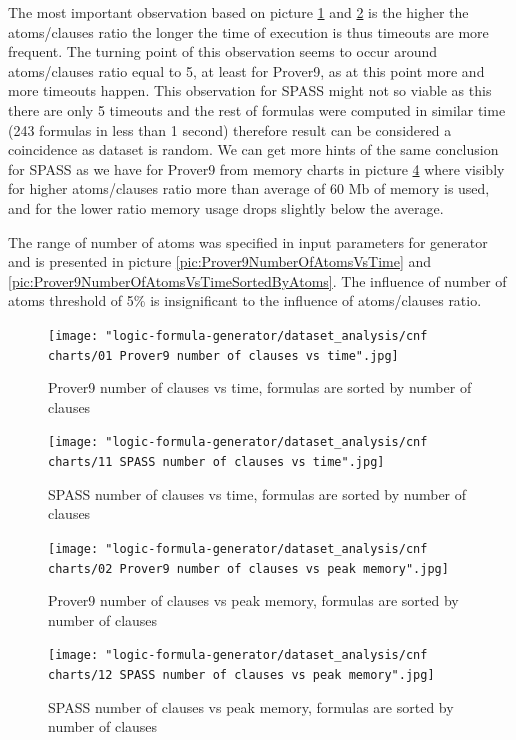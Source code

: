 The most important observation based on picture \ref{pic:Prover9NumberOfClausesVsTime} and \ref{pic:SPASSNumberOfClausesVsTime} is the higher the atoms/clauses ratio the longer the time of execution is thus timeouts are more frequent. The turning point of this observation seems to occur around atoms/clauses ratio equal to 5, at least for Prover9, as at this point more and more timeouts happen. This observation for SPASS might not so viable as this there are only 5 timeouts and the rest of formulas were computed in similar time (243 formulas in less than 1 second) therefore result can be considered a coincidence as dataset is random. We can get more hints of the same conclusion for SPASS as we have for Prover9 from memory charts in picture \ref{pic:SPASSNumberOfClausesVsMemory} where visibly for higher atoms/clauses ratio more than average of 60 Mb of memory is used, and for the lower ratio memory usage drops slightly below the average.

The range of number of atoms was specified in input parameters for generator and is presented in picture \ref{pic:Prover9NumberOfAtomsVsTime} and \ref{pic:Prover9NumberOfAtomsVsTimeSortedByAtoms}. The influence of number of atoms threshold of 5\% is insignificant to the influence of atoms/clauses ratio.

\begin{figure}[h]
  \centering
  \texttt{[image: "logic-formula-generator/dataset\_analysis/cnf charts/01 Prover9 number of clauses vs time".jpg]}
  \caption{Prover9 number of clauses vs time, formulas are sorted by number of clauses}
  \label{pic:Prover9NumberOfClausesVsTime}
\end{figure}

\begin{figure}[h]
  \centering
  \texttt{[image: "logic-formula-generator/dataset\_analysis/cnf charts/11 SPASS number of clauses vs time".jpg]}
  \caption{SPASS number of clauses vs time, formulas are sorted by number of clauses}
  \label{pic:SPASSNumberOfClausesVsTime}
\end{figure}

\begin{figure}[h]
  \centering
  \texttt{[image: "logic-formula-generator/dataset\_analysis/cnf charts/02 Prover9 number of clauses vs peak memory".jpg]}
  \caption{Prover9 number of clauses vs peak memory, formulas are sorted by number of clauses}
  \label{pic:Prover9NumberOfClausesVsMemory}
\end{figure}

\begin{figure}[h]
  \centering
  \texttt{[image: "logic-formula-generator/dataset\_analysis/cnf charts/12 SPASS number of clauses vs peak memory".jpg]}
  \caption{SPASS number of clauses vs peak memory, formulas are sorted by number of clauses}
  \label{pic:SPASSNumberOfClausesVsMemory}
\end{figure}

